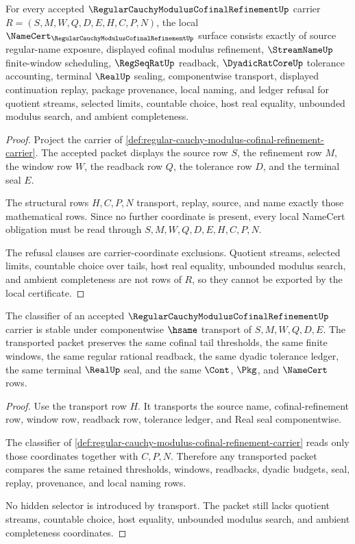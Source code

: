 \begin{theorem}
\label{thm:regular-cauchy-modulus-cofinal-refinement-namecert-obligations}
For every accepted $\RegularCauchyModulusCofinalRefinementUp$ carrier $R=(S,M,W,Q,D,E,H,C,P,N)$, the local $\NameCert_{\RegularCauchyModulusCofinalRefinementUp}$ surface consists exactly of source regular-name exposure, displayed cofinal modulus refinement, $\StreamNameUp$ finite-window scheduling, $\RegSeqRatUp$ readback, $\DyadicRatCoreUp$ tolerance accounting, terminal $\RealUp$ sealing, componentwise transport, displayed continuation replay, package provenance, local naming, and ledger refusal for quotient streams, selected limits, countable choice, host real equality, unbounded modulus search, and ambient completeness.
\end{theorem}
\begin{proof}
Project the carrier of \autoref{def:regular-cauchy-modulus-cofinal-refinement-carrier}. The accepted packet displays the source row $S$, the refinement row $M$, the window row $W$, the readback row $Q$, the tolerance row $D$, and the terminal seal $E$.

The structural rows $H,C,P,N$ transport, replay, source, and name exactly those mathematical rows. Since no further coordinate is present, every local NameCert obligation must be read through $S,M,W,Q,D,E,H,C,P,N$.

The refusal clauses are carrier-coordinate exclusions. Quotient streams, selected limits, countable choice over tails, host real equality, unbounded modulus search, and ambient completeness are not rows of $R$, so they cannot be exported by the local certificate.
\end{proof}

\begin{theorem}
\label{thm:regular-cauchy-modulus-cofinal-refinement-stability}
The classifier of an accepted $\RegularCauchyModulusCofinalRefinementUp$ carrier is stable under componentwise $\hsame$ transport of $S,M,W,Q,D,E$. The transported packet preserves the same cofinal tail thresholds, the same finite windows, the same regular rational readback, the same dyadic tolerance ledger, the same terminal $\RealUp$ seal, and the same $\Cont$, $\Pkg$, and $\NameCert$ rows.
\end{theorem}
\begin{proof}
Use the transport row $H$. It transports the source name, cofinal-refinement row, window row, readback row, tolerance ledger, and Real seal componentwise.

The classifier of \autoref{def:regular-cauchy-modulus-cofinal-refinement-carrier} reads only those coordinates together with $C,P,N$. Therefore any transported packet compares the same retained thresholds, windows, readbacks, dyadic budgets, seal, replay, provenance, and local naming rows.

No hidden selector is introduced by transport. The packet still lacks quotient streams, countable choice, host equality, unbounded modulus search, and ambient completeness coordinates.
\end{proof}

